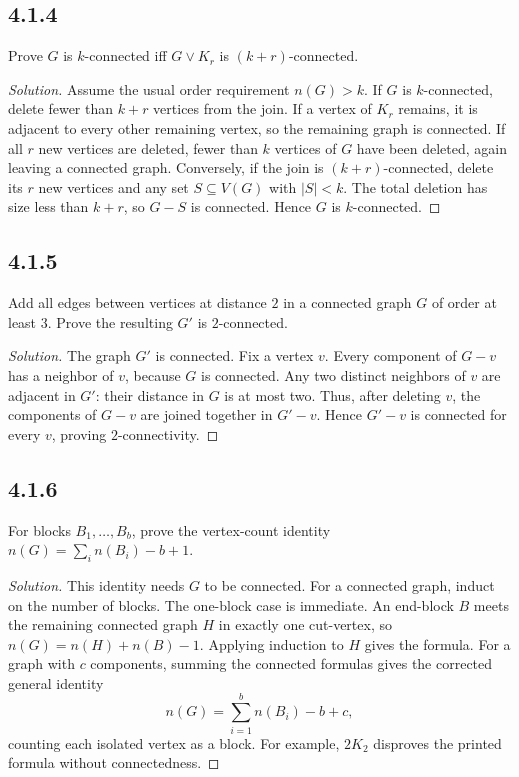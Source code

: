 \documentclass[12pt]{amsart}
\newenvironment{solution}{\begin{proof}[Solution]}{\end{proof}}
\begin{document}
    \subsection*{4.1.4} Prove $G$ is $k$-connected iff $G\vee K_r$ is $(k+r)$-connected.
    \begin{solution}Assume the usual order requirement $n(G)>k$. If $G$ is $k$-connected, delete fewer than $k+r$ vertices from the join. If a vertex of $K_r$ remains, it is adjacent to every other remaining vertex, so the remaining graph is connected. If all $r$ new vertices are deleted, fewer than $k$ vertices of $G$ have been deleted, again leaving a connected graph.
    Conversely, if the join is $(k+r)$-connected, delete its $r$ new vertices and any set $S\subseteq V(G)$ with $|S|<k$. The total deletion has size less than $k+r$, so $G-S$ is connected. Hence $G$ is $k$-connected.\end{solution}

    \subsection*{4.1.5} Add all edges between vertices at distance $2$ in a connected graph $G$ of order at least $3$. Prove the resulting $G'$ is $2$-connected.
    \begin{solution}The graph $G'$ is connected. Fix a vertex $v$. Every component of $G-v$ has a neighbor of $v$, because $G$ is connected. Any two distinct neighbors of $v$ are adjacent in $G'$: their distance in $G$ is at most two. Thus, after deleting $v$, the components of $G-v$ are joined together in $G'-v$. Hence $G'-v$ is connected for every $v$, proving $2$-connectivity.\end{solution}

    \subsection*{4.1.6} For blocks $B_1,\ldots,B_b$, prove the vertex-count identity $n(G)=\sum_i n(B_i)-b+1$.
    \begin{solution}This identity needs $G$ to be connected. For a connected graph, induct on the number of blocks. The one-block case is immediate. An end-block $B$ meets the remaining connected graph $H$ in exactly one cut-vertex, so $n(G)=n(H)+n(B)-1$. Applying induction to $H$ gives the formula.
    For a graph with $c$ components, summing the connected formulas gives the corrected general identity
        \[
            n(G)=\sum_{i=1}^{b}n(B_i)-b+c,
        \]
        counting each isolated vertex as a block. For example, $2K_2$ disproves the printed formula without connectedness.\end{solution}
\end{document}
